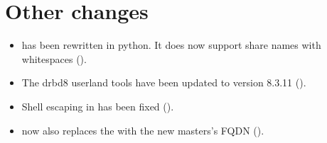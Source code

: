 \section{Other changes}
\begin{itemize}
\item {} has been rewritten in python. It does
  now support share names with whitespaces ().
\item The drbd8 userland tools have been updated to version 8.3.11 ().
\item Shell escaping in  has been fixed ().
\item {} now also replaces the
 with the new masters's FQDN ().


\end{itemize}
